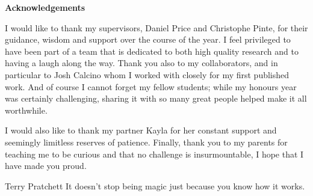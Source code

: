 
\begin{center}
    
    {\Large \textbf{Acknowledgements}}
    
\end{center}

\noindent I would like to thank my supervisors, Daniel Price and Christophe Pinte, for their guidance, wisdom and support over the course of the year.
I feel privileged to have been part of a team that is dedicated to both high quality research and to having a laugh along the way.
Thank you also to my collaborators, and in particular to Josh Calcino whom I worked with closely for my first published work.
And of course I cannot forget my fellow students; while my honours year was certainly challenging, sharing it with so many great people helped make it all worthwhile.

I would also like to thank my partner Kayla for her constant support and seemingly limitless reserves of patience.
Finally, thank you to my parents for teaching me to be curious and that no challenge is insurmountable, I hope that I have made you proud.

\vfill

\begin{chapquote}{Terry Pratchett}
    It doesn't stop being magic just because you know how it works.
\end{chapquote}

\newpage